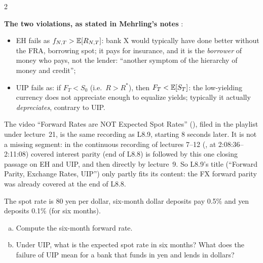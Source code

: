 \begin{paracol}{2}
\begin{keyformulas}
\textbf{The two violations, as stated in Mehrling's notes} :
\begin{itemize}
  \item EH fails as $f_{N,T} > \mathbb{E}[R_{N,T}]$: bank X would typically have done better without the FRA, borrowing spot; it pays for insurance, and it is the \emph{borrower} of
        money who pays, not the lender: ``another symptom of the hierarchy of money and credit'';
  \item UIP fails as: if $F_T<S_0$ (i.e.\ $R>R^\ast$), then $F_T<\mathbb{E}[S_T]$: the low-yielding currency does not appreciate enough to equalize yields; typically it actually
        \emph{depreciates}, contrary to UIP.
\end{itemize}
\end{keyformulas}

\begin{coursenote}[Segment 8.10]
The video ``Forward Rates are NOT Expected Spot Rates'' (), filed in the playlist under lecture~21, is the same recording as L8.9, starting 8 seconds later. It is not a missing segment: in the continuous recording of lectures 7--12 (, at 2:08:36--2:11:08) covered interest parity (end of L8.8) is followed by this one closing passage on EH and UIP, and then directly by lecture~9. So L8.9's title (``Forward Parity, Exchange Rates, UIP'') only partly fits its content: the FX forward parity was already covered at the end of L8.8.
\end{coursenote}

\flushside

\begin{exercise}
The spot rate is 80 yen per dollar, six-month dollar deposits pay 0.5\% and yen deposits 0.1\% (for six months).
\begin{enumerate}[(a)]
  \item Compute the six-month forward rate.
  \item Under UIP, what is the expected spot rate in six months? What does the failure of UIP mean for a bank that funds in yen and lends in dollars?
\end{enumerate}
\end{exercise}

\end{paracol}
